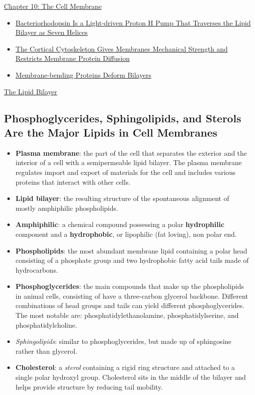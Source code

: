 \documentclass[12pt,letterpaper]{article}
\begin{document}
\begin{chapbox}{\hyperlink{home}{Chapter 10: The Cell Membrane}}
\begin{enumerate}
\begin{itemize}
            \item \hyperlink{10.12}{ Bacteriorhodopsin Is a Light-driven Proton H\bfg{^+} Pump That Traverses the Lipid Bilayer as Seven \bfg{\alpha} Helices}
            \item \hyperlink{10.1}{ The Cortical Cytoskeleton Gives Membranes Mechanical Strength and Restricts Membrane Protein Diffusion}
            \item \hyperlink{10.1}{ Membrane-bending Proteins Deform Bilayers}
        \end{itemize}
    \end{enumerate}
\end{chapbox}

\hypertarget{10.1a}{}
\begin{secbox}{\hyperlink{10}{The Lipid Bilayer}}{
    \hypertarget{10.1}{\subsection*{Phosphoglycerides, Sphingolipids, and Sterols Are the Major Lipids in Cell Membranes}}
    \begin{itemize}
        \item \textbf{Plasma membrane}: the part of the cell that separates the exterior and the interior of a cell with a semipermeable lipid bilayer. The plasma membrane regulates import and export of materials for the cell and includes various proteins that interact with other cells. 
        \item \textbf{Lipid bilayer}: the resulting structure of the spontaneous alignment of mostly amphiphilic phospholipids. 
        \item \textbf{Amphiphilic}: a chemical compound possessing a polar \textbf{hydrophilic} component and a \textbf{hydrophobic}, or lipophilic (fat loving), non polar end.
        \item \textbf{Phospholipids}: the most abundant membrane lipid containing a polar head consisting of a phosphate group and two hydrophobic fatty acid tails made of hydrocarbons.
        \item \textbf{Phosphoglycerides}: the main compounds that make up the phospholipids in animal cells, consisting of have a three-carbon glycerol backbone. Different combinations of head groups and tails can yield different phosphoglycerides. The most notable are: phosphatidylethanolamine, phosphatidylserine, and phosphatidylcholine.
        \item \textit{Sphingolipids}: similar to phosphoglycerides, but made up of sphingosine rather than glycerol.
        \item \textbf{Cholesterol}: a \textit{sterol} containing a rigid ring structure and attached to a single polar hydroxyl group. Cholesterol sits in the middle of the bilayer and helps provide structure by reducing tail mobility. 
    \end{itemize}

}
\end{secbox}
\end{document}
